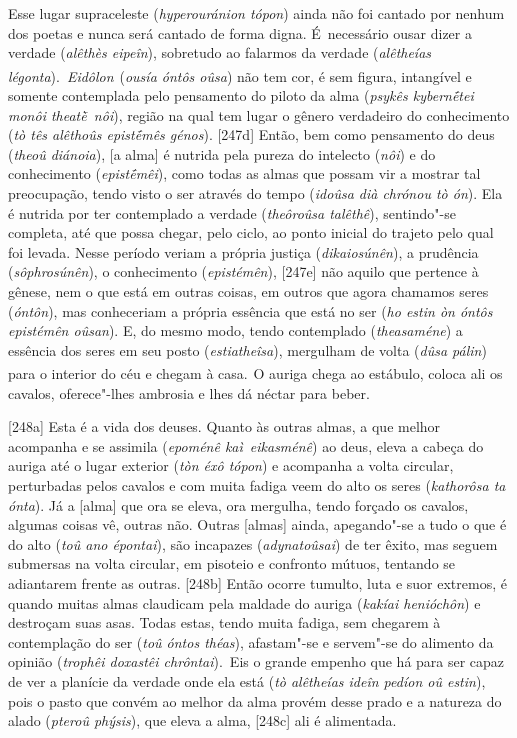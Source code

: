Esse lugar supraceleste (\emph{hyperouránion tópon}) ainda não foi
cantado por nenhum dos poetas e nunca será cantado de forma digna. É~necessário ousar dizer a verdade (\emph{alêthès eipeîn}), sobretudo ao
falarmos da verdade (\emph{alêtheías
légonta}).~\emph{Eidôlon}\textsuperscript{~}(\emph{ousía óntôs oûsa})
não tem cor, é sem figura, intangível e somente contemplada pelo
pensamento do piloto da alma (\emph{psykês kybernḗtei monôi
theatḕ~nôi}), região na qual tem lugar o gênero verdadeiro do
conhecimento (\emph{tò tês alêthoûs epistḗmês génos}). [247d] Então,
bem como pensamento do deus (\emph{theoû diánoia}), [a alma] é
nutrida pela pureza do intelecto (\emph{nôi}) e do conhecimento
(\emph{epistḗmêi}), como todas as almas que possam vir a mostrar tal
preocupação, tendo visto o ser através do tempo (\emph{idoûsa dià
chrónou tò ón}). Ela é nutrida por ter contemplado a verdade
(\emph{theôroûsa talêthê}), sentindo"-se completa, até que possa chegar,
pelo ciclo, ao ponto inicial do trajeto pelo qual foi levada. Nesse
período veriam a própria justiça (\emph{dikaiosúnên}), a prudência
(\emph{sôphrosúnên}), o conhecimento (\emph{epistémên}), [247e] não
aquilo que pertence à gênese, nem o que está em outras coisas, em outros
que agora chamamos seres (\emph{óntôn}), mas conheceriam a própria
essência que está no ser (\emph{ho estin òn óntôs epistémên oûsan}). E,
do mesmo modo, tendo contemplado (\emph{theasaméne}) a essência dos
seres em seu posto (\emph{estiatheîsa}), mergulham de volta (\emph{dûsa
pálin}) para o interior do céu e chegam à casa.\textsuperscript{~}O
auriga chega ao estábulo, coloca ali os cavalos, oferece"-lhes ambrosia e
lhes dá néctar para beber.

[248a] Esta é a vida dos deuses. Quanto às outras almas, a que
melhor acompanha e se assimila (\emph{epoménê kaì}~\emph{eikasménê}) ao
deus, eleva a cabeça do auriga até o lugar exterior (\emph{tòn éxô
tópon}) e acompanha a volta circular, perturbadas pelos cavalos e com
muita fadiga veem do alto os seres (\emph{kathorôsa ta ónta}). Já a
[alma] que ora se eleva, ora mergulha, tendo forçado os cavalos,
algumas coisas vê, outras não. Outras [almas] ainda, apegando"-se a
tudo o que é do alto (\emph{toû ano épontai}), são incapazes
(\emph{adynatoûsai}) de ter êxito, mas seguem submersas na volta
circular, em pisoteio e confronto mútuos, tentando se adiantarem frente
as outras. [248b] Então ocorre tumulto, luta e suor extremos, é
quando muitas almas claudicam pela maldade do auriga (\emph{kakíai
henióchôn}) e destroçam suas asas. Todas estas, tendo muita fadiga, sem
chegarem à contemplação do ser (\emph{toû óntos théas}), afastam"-se e
servem"-se do alimento da opinião (\emph{trophêi doxastêi chrôntai}).~Eis
o grande empenho que há para ser capaz de ver a planície da verdade onde
ela está (\emph{tò alêtheías ideîn pedíon oû estin}), pois o pasto que
convém ao melhor da alma provém desse prado e a natureza do alado
(\emph{pteroû phýsis}), que eleva a alma, [248c] ali é alimentada.

